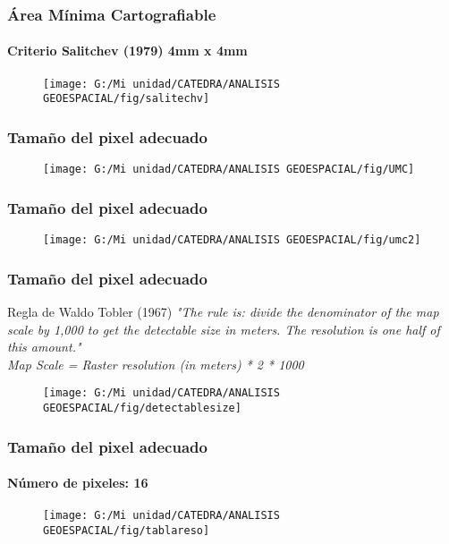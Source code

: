 \documentclass[14pt]{beamer}
\begin{document}
\begin{frame}
\frametitle{Área Mínima Cartografiable}
\framesubtitle{Criterio Salitchev (1979) 4mm x 4mm}
 \begin{figure}
    \centering
    \texttt{[image: G:/Mi unidad/CATEDRA/ANALISIS GEOESPACIAL/fig/salitechv]}
  \end{figure}
\end{frame}
\begin{frame}
\frametitle{Tamaño del pixel adecuado}
 \begin{figure}
    \centering
    \texttt{[image: G:/Mi unidad/CATEDRA/ANALISIS GEOESPACIAL/fig/UMC]}
  \end{figure}
\end{frame}
\begin{frame}
\frametitle{Tamaño del pixel adecuado}
 \begin{figure}
    \centering
    \texttt{[image: G:/Mi unidad/CATEDRA/ANALISIS GEOESPACIAL/fig/umc2]}
  \end{figure}
\end{frame}
\begin{frame}
\frametitle{Tamaño del pixel adecuado}
\begin{exampleblock}{Regla de Waldo Tobler (1967) }
\small{\emph{"The rule is: divide the denominator of the map scale by 1,000 to get the detectable size in meters. The resolution is one half of this amount."\\
Map Scale = Raster resolution (in meters) * 2 * 1000}}
\end{exampleblock}
 \begin{figure}
    \centering
    \texttt{[image: G:/Mi unidad/CATEDRA/ANALISIS GEOESPACIAL/fig/detectablesize]}
  \end{figure}
\end{frame}
\begin{frame}
\frametitle{Tamaño del pixel adecuado}
\framesubtitle{Número de pixeles: 16}
 \begin{figure}
    \centering
    \texttt{[image: G:/Mi unidad/CATEDRA/ANALISIS GEOESPACIAL/fig/tablareso]}
  \end{figure}
\end{frame}
\end{document}
